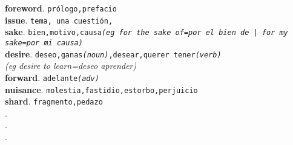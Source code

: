 \documentclass[twocolumn]{article}
\begin{document}
	\textsf{\textbf{foreword}}. \texttt{pr\'ologo,prefacio}\\
	\textsf{\textbf{issue}}. \texttt{tema, una cuesti\'on,}\\
	\textsf{\textbf{sake}}. \texttt{bien,motivo,causa{\scriptsize \textsl{(eg for the sake of=por el bien de | for my sake=por mi causa)}}}\\
	\textsf{\textbf{desire}}. \texttt{deseo,ganas{\scriptsize \textsl{(noun)}},desear,querer tener{\scriptsize \textsl{(verb)}}}\\{\scriptsize \textsl{(eg desire to learn=deseo aprender)}}\\
	\textsf{\textbf{forward}}. \texttt{adelante{\scriptsize \textsl{(adv)}}}\\
	\textsf{\textbf{nuisance}}. \texttt{molestia,fastidio,estorbo,perjuicio}\\
	\textsf{\textbf{shard}}. \texttt{fragmento,pedazo}\\
	\textsf{\textbf{}}. \texttt{}\\
	\textsf{\textbf{}}. \texttt{}\\
	\textsf{\textbf{}}. \texttt{}\\
\end{document}
